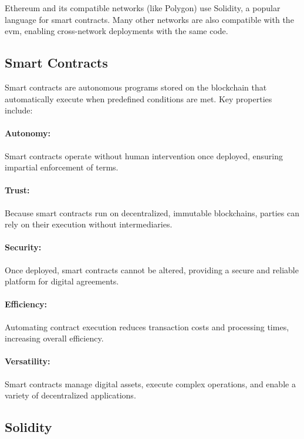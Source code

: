 Ethereum and its compatible networks (like Polygon) use Solidity, a popular
language for smart contracts. Many other networks are also compatible with the
\gls{evm}, enabling cross-network deployments with the same code.

\subsection{Smart Contracts}\label{subsec:smart_contracts}

Smart contracts are autonomous programs stored on the blockchain that
automatically execute when predefined conditions are met. Key properties
include:

\paragraph{Autonomy:}
Smart contracts operate without human intervention once deployed, ensuring
impartial enforcement of terms.

\paragraph{Trust:}
Because smart contracts run on decentralized, immutable blockchains, parties
can rely on their execution without intermediaries.

\paragraph{Security:}
Once deployed, smart contracts cannot be altered, providing a secure and
reliable platform for digital agreements.

\paragraph{Efficiency:}
Automating contract execution reduces transaction costs and processing times,
increasing overall efficiency.

\paragraph{Versatility:}
Smart contracts manage digital assets, execute complex operations, and enable a
variety of decentralized applications.

\subsection{Solidity}\label{subsec:solidity}

